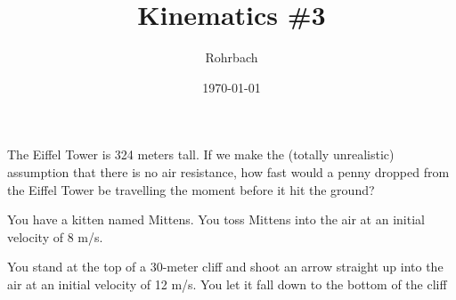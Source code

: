 \documentclass[10pt]{exam}
\title{Kinematics \#3}
\author{Rohrbach}
\date{\today}
\begin{document}
\maketitle

\printeqs

\begin{questions}
  \question  
    The Eiffel Tower is 324 meters tall.  If we make the (totally unrealistic) assumption that there is no air resistance, how fast would a penny dropped from the Eiffel Tower be travelling the moment before it hit the ground?
    \vspace{5cm}

  \question
    You have a kitten named Mittens.  You toss Mittens into the air at an initial velocity of 8 m/s.  
    
    
  \pagebreak

  \printeqs

  \question
    You stand at the top of a 30-meter cliff and shoot an arrow straight up into the air at an initial velocity of 12 m/s.  You let it fall down to the bottom of the cliff

\end{questions}
\end{document}
